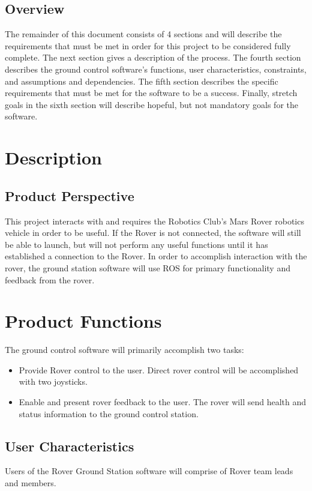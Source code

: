 \documentclass[onecolumn, draftclsnofoot, 10pt, compsoc]{IEEEtran}
\begin{document}
\subsection{Overview}
The remainder of this document consists of 4 sections and will describe the requirements that must be met in order for this project to be considered fully complete. The next section gives a description of the process. 
The fourth section describes the ground control software's functions, user characteristics, constraints, and assumptions and dependencies. 
The fifth section describes the specific requirements that must be met for the software to be a success.
Finally, stretch goals in the sixth section will describe hopeful, but not mandatory goals for the software.

\section{Description}
\subsection{Product Perspective}
This project interacts with and requires the Robotics Club's Mars Rover robotics vehicle in order to be useful.
If the Rover is not connected, the software will still be able to launch, but will not perform any useful functions until it has established a connection to the Rover.
In order to accomplish interaction with the rover, the ground station software will use ROS for primary functionality and feedback from the rover.


\section{Product Functions}
The ground control software will primarily accomplish two tasks:
\begin{itemize}
\item Provide Rover control to the user.
Direct rover control will be accomplished with two joysticks.
\item Enable and present rover feedback to the user.
The rover will send health and status information to the ground control station.
\end{itemize}


\subsection{User Characteristics}
Users of the Rover Ground Station software will comprise of Rover team leads and members.
\end{document}

